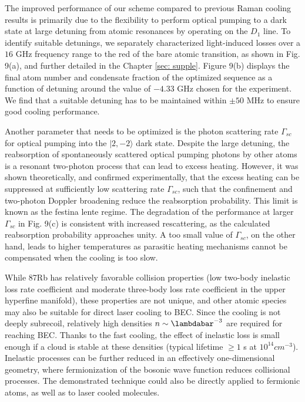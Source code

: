 \documentclass{article}
\begin{document}
The improved performance of our scheme compared to previous Raman cooling results is primarily due to the flexibility to perform optical pumping to a dark state at large detuning from atomic resonances by operating on the $D_1$ line. To identify suitable detunings, we separately characterized light-induced losses over a $16$ GHz frequency range to the red of the bare atomic transition, as shown in Fig. 9(a), and further detailed in the Chapter \ref{sec: supple}. Figure 9(b) displays the final atom number and condensate fraction of the optimized sequence as a function of detuning around the value of $-4.33$ GHz chosen for the experiment. We find that a suitable detuning has to be maintained within $\pm 50$ MHz to ensure good cooling performance.

Another parameter that needs to be optimized is the photon scattering rate $\Gamma_{sc}$ for optical pumping into the $\vert 2, -2 \rangle$ dark state. Despite the large detuning, the reabsorption of spontaneously scattered optical pumping photons by other atoms is a resonant two-photon process that can lead to excess heating. However, it was shown theoretically, and confirmed experimentally, that the excess heating can be suppressed at sufficiently low scattering rate $\Gamma_{sc}$, such that the confinement and two-photon Doppler broadening reduce the reabsorption probability. This limit is known as the festina lente regime. The degradation of the performance at larger $\Gamma_{sc}$ in Fig. 9(c) is consistent with increased rescattering, as the calculated reabsorption probability approaches unity. A too small value of $\Gamma_{sc}$, on the other hand, leads to higher temperatures as parasitic heating mechanisms cannot be compensated when the cooling is too slow.

While 87Rb has relatively favorable collision properties (low two-body inelastic loss rate coefficient and moderate three-body loss rate coefficient in the upper hyperfine manifold), these properties are not unique, and other atomic species may also be suitable for direct laser cooling to BEC. Since the cooling is not deeply subrecoil, relatively high densities $n \sim \lambdabar^{-3}$ are required for reaching BEC. Thanks to the fast cooling, the effect of inelastic loss is small enough if a cloud is stable at these densities (typical lifetime $\geq 1$ s at $10^{14} cm^{-3}$). Inelastic processes can be further reduced in an effectively one-dimensional geometry, where fermionization of the bosonic wave function reduces collisional processes. The demonstrated technique could also be directly applied to fermionic atoms, as well as to laser cooled molecules.
\end{document}
